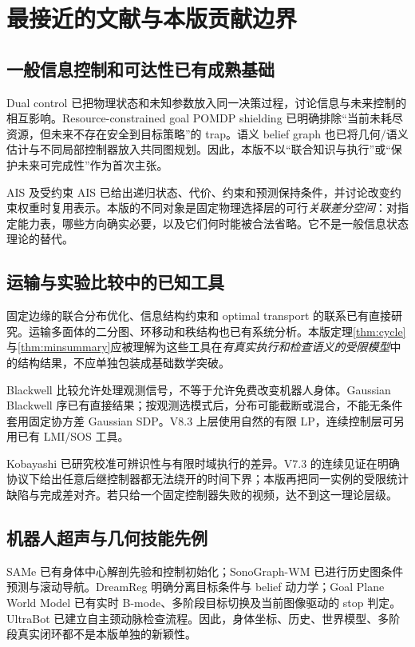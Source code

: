 \documentclass[UTF8,11pt,a4paper,fontset=fandol]{ctexart}
\numberwithin{equation}{section}
\theoremstyle{definition}
\begin{document}
\section{最接近的文献与本版贡献边界}
\label{sec:related}

\subsection{一般信息控制和可达性已有成熟基础}
Dual control 已把物理状态和未知参数放入同一决策过程，讨论信息与未来控制的相互影响\cite{dualcontrol}。Resource-constrained goal POMDP shielding 已明确排除“当前未耗尽资源，但未来不存在安全到目标策略”的 trap\cite{shield}。语义 belief graph 也已将几何/语义估计与不同局部控制器放入共同图规划\cite{semanticgraph}。因此，本版不以“联合知识与执行”或“保护未来可完成性”作为首次主张。

AIS 及受约束 AIS 已给出递归状态、代价、约束和预测保持条件，并讨论改变约束权重时复用表示\cite{ais,constrainedais}。本版的不同对象是固定物理选择层的可行\emph{关联差分空间}：对指定能力表，哪些方向确实必要，以及它们何时能被合法省略。它不是一般信息状态理论的替代。

\subsection{运输与实验比较中的已知工具}
固定边缘的联合分布优化、信息结构约束和 optimal transport 的联系已有直接研究\cite{strategicmeasures}。运输多面体的二分图、环移动和秩结构也已有系统分析\cite{transportpoly}。本版定理\ref{thm:cycle}与\ref{thm:minsummary}应被理解为这些工具在\emph{有真实执行和检查语义的受限模型}中的结构结果，不应单独包装成基础数学突破。

Blackwell 比较允许处理观测信号，不等于允许免费改变机器人身体\cite{blackwellmodern}。Gaussian Blackwell 序已有直接结果\cite{kolchinsky}；按观测选模式后，分布可能截断或混合，不能无条件套用固定协方差 Gaussian SDP。V8.3 上层使用自然的有限 LP，连续控制层可另用已有 LMI/SOS 工具。

Kobayashi 已研究校准可辨识性与有限时域执行的差异\cite{kobayashi}。V7.3 的连续见证在明确协议下给出任意后继控制器都无法绕开的时间下界；本版再把同一实例的受限统计缺陷与完成差对齐。若只给一个固定控制器失败的视频，达不到这一理论层级。

\subsection{机器人超声与几何技能先例}
SAMe 已有身体中心解剖先验和控制初始化；SonoGraph-WM 已进行历史图条件预测与滚动导航\cite{same,sonograph}。DreamReg 明确分离目标条件与 belief 动力学；Goal Plane World Model 已有实时 B-mode、多阶段目标切换及当前图像驱动的 stop 判定\cite{dreamreg,goalwm}。UltraBot 已建立自主颈动脉检查流程\cite{ultrabot}。因此，身体坐标、历史、世界模型、多阶段真实闭环都不是本版单独的新颖性。
\end{document}
